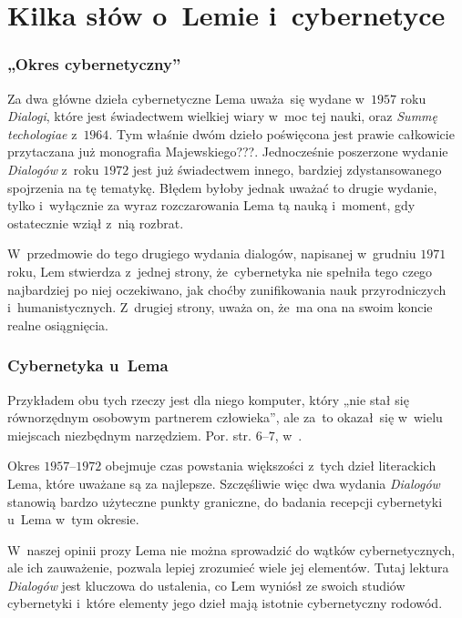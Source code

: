 \documentclass[10pt,t]{beamer}
\begin{document}
\section{Kilka słów o~Lemie i~cybernetyce}


\begin{frame}
  \frametitle{„Okres cybernetyczny”}


  Za dwa główne dzieła cybernetyczne Lema uważa~się wydane w~$1957$ roku
  \textit{Dialogi}, które jest świadectwem wielkiej wiary w~moc tej nauki,
  oraz \textit{Summę techologiae} z~$1964$. Tym właśnie dwóm dzieło
  poświęcona jest prawie całkowicie przytaczana już monografia
  Majewskiego???. Jednocześnie poszerzone wydanie \textit{Dialogów} z~roku
  $1972$ jest już świadectwem innego, bardziej zdystansowanego
  spojrzenia na tę tematykę. Błędem byłoby jednak uważać to drugie wydanie,
  tylko i~wyłącznie za wyraz rozczarowania Lema tą nauką i~moment, gdy
  ostatecznie wziął z~nią rozbrat.

  W~przedmowie do tego drugiego wydania dialogów, napisanej w~grudniu
  $1971$ roku, Lem stwierdza z~jednej strony, że~cybernetyka nie spełniła
  tego czego najbardziej po niej oczekiwano, jak choćby zunifikowania
  nauk przyrodniczych i~humanistycznych. Z~drugiej strony, uważa on,
  że~ma ona na swoim koncie realne osiągnięcia.

\end{frame}





\begin{frame}
  \frametitle{Cybernetyka u~Lema}


  Przykładem obu tych rzeczy jest dla niego komputer, który „nie stał się
  równorzędnym osobowym partnerem człowieka”, ale za~to okazał~się w~wielu
  miejscach niezbędnym narzędziem. Por. str. $6\text{--}7$,
  w~\parencite{Lem-Dialogi-Vol-I-Pub-1996}.

  Okres $1957\text{--}1972$ obejmuje czas powstania większości z~tych
  dzieł literackich Lema, które uważane są za najlepsze. Szczęśliwie więc
  dwa wydania \textit{Dialogów} stanowią bardzo użyteczne punkty graniczne,
  do badania recepcji cybernetyki u~Lema w~tym okresie.

  W~naszej opinii prozy Lema \alert{nie} można sprowadzić do wątków
  cybernetycznych, ale ich zauważenie, pozwala lepiej zrozumieć wiele
  jej elementów. Tutaj lektura \textit{Dialogów} jest kluczowa do ustalenia,
  co Lem wyniósł ze swoich studiów cybernetyki i~które elementy jego
  dzieł mają istotnie cybernetyczny rodowód.

\end{frame}
\end{document}
